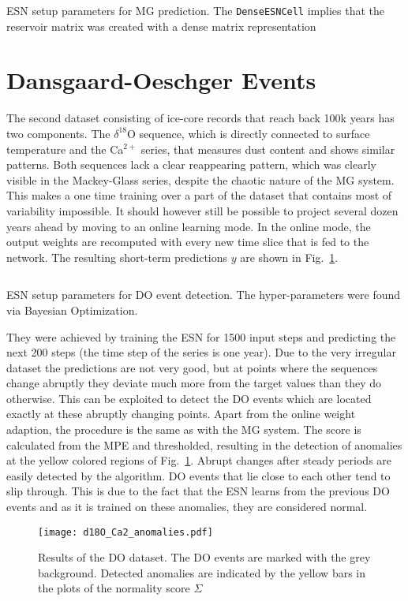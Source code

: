 \begin{listing}
  \inputminted{json}{pseudocode/model_setups/mackey_setup.json}
  \label{lst:mackey_setup}
  \caption{ESN setup parameters for MG prediction. The \texttt{DenseESNCell}
    implies that the reservoir matrix was created with a dense matrix representation
  }
\end{listing}






\clearpage
\section{Dansgaard-Oeschger Events}%
\label{sec:res_dansgaard_oeschger_events}

The second dataset consisting of ice-core records that reach back 100k years
has two components. The $\delta^{18}$O sequence, which is directly connected to
surface temperature and the Ca$^{2+}$ series, that measures dust content and
shows similar patterns.  Both sequences lack a clear reappearing pattern, which
was clearly visible in the Mackey-Glass series, despite the chaotic nature of
the MG system. This makes a one time training over a part of the dataset that
contains most of variability impossible.  It should however still be possible
to project several dozen years ahead by moving to an online learning mode. In
the online mode, the output weights are recomputed with every new time slice
that is fed to the network.  The resulting short-term predictions $y$ are shown
in Fig.~\ref{fig:d18O_anomalies}.
\begin{listing}
  \inputminted{json}{pseudocode/model_setups/DO_setup.json}
  \label{lst:DO_setup}
  \caption{ESN setup parameters for DO event detection. The hyper-parameters were
  found via Bayesian Optimization.}
\end{listing}
They were achieved by training the ESN for 1500 input steps and predicting the
next 200 steps (the time step of the series is one year). Due to the very
irregular dataset the predictions are not very good, but at points where the
sequences change abruptly they deviate much more from the target values than
they do otherwise. This can be exploited to detect the DO events which are
located exactly at these abruptly changing points. Apart from the online weight
adaption, the procedure is the same as with the MG system. The score is
calculated from the MPE and thresholded, resulting in the detection of
anomalies at the yellow colored regions of Fig.~\ref{fig:d18O_anomalies}.
Abrupt changes after steady periods are easily detected by the algorithm.  DO
events that lie close to each other tend to slip through. This is due to the
fact that the ESN learns from the previous DO events and as it is trained on
these anomalies, they are considered normal.
\begin{figure}
  \centering
  \texttt{[image: d18O\_Ca2\_anomalies.pdf]}
  \caption{Results of the DO dataset. The DO events are marked with
  the grey background. Detected anomalies are indicated by the yellow bars in
  the plots of the normality score $\Sigma$}
  \label{fig:d18O_anomalies}
\end{figure}




